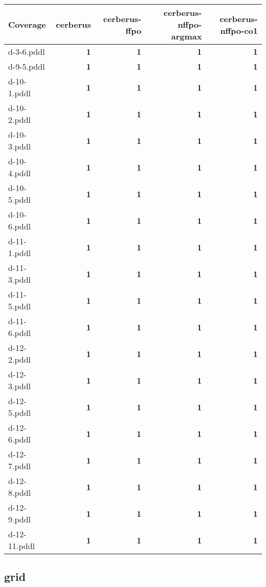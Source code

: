 \documentclass{article}
\begin{document}
\begin{tabular}{@{}lrrrr@{}}
Coverage & cerberus & cerberus-ffpo & cerberus-nffpo-argmax & cerberus-nffpo-co1 \\
\midrule
d-3-6.pddl & \textbf{1} & \textbf{1} & \textbf{1} & \textbf{1} \\
d-9-5.pddl & \textbf{1} & \textbf{1} & \textbf{1} & \textbf{1} \\
d-10-1.pddl & \textbf{1} & \textbf{1} & \textbf{1} & \textbf{1} \\
d-10-2.pddl & \textbf{1} & \textbf{1} & \textbf{1} & \textbf{1} \\
d-10-3.pddl & \textbf{1} & \textbf{1} & \textbf{1} & \textbf{1} \\
d-10-4.pddl & \textbf{1} & \textbf{1} & \textbf{1} & \textbf{1} \\
d-10-5.pddl & \textbf{1} & \textbf{1} & \textbf{1} & \textbf{1} \\
d-10-6.pddl & \textbf{1} & \textbf{1} & \textbf{1} & \textbf{1} \\
d-11-1.pddl & \textbf{1} & \textbf{1} & \textbf{1} & \textbf{1} \\
d-11-3.pddl & \textbf{1} & \textbf{1} & \textbf{1} & \textbf{1} \\
d-11-5.pddl & \textbf{1} & \textbf{1} & \textbf{1} & \textbf{1} \\
d-11-6.pddl & \textbf{1} & \textbf{1} & \textbf{1} & \textbf{1} \\
d-12-2.pddl & \textbf{1} & \textbf{1} & \textbf{1} & \textbf{1} \\
d-12-3.pddl & \textbf{1} & \textbf{1} & \textbf{1} & \textbf{1} \\
d-12-5.pddl & \textbf{1} & \textbf{1} & \textbf{1} & \textbf{1} \\
d-12-6.pddl & \textbf{1} & \textbf{1} & \textbf{1} & \textbf{1} \\
d-12-7.pddl & \textbf{1} & \textbf{1} & \textbf{1} & \textbf{1} \\
d-12-8.pddl & \textbf{1} & \textbf{1} & \textbf{1} & \textbf{1} \\
d-12-9.pddl & \textbf{1} & \textbf{1} & \textbf{1} & \textbf{1} \\
d-12-11.pddl & \textbf{1} & \textbf{1} & \textbf{1} & \textbf{1} \\
\end{tabular}

\hypertarget{coverage-grid}{}
\subsection*{grid}
\end{document}
